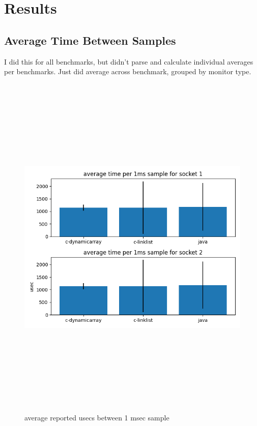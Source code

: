 \section{Results}

\subsection{Average Time Between Samples}
I did this for all benchmarks, but didn't parse and calculate individual averages per benchmarks. Just did average across benchmark, grouped by monitor type.
    \begin{figure}[H]
    	\centering
    	\includegraphics[width=17cm,height=17cm,keepaspectratio]{AsyncMonitorCompares/time-energy-persample/timestamp_average_usec_per-sample.png}
    	\caption{average reported usecs between 1 msec sample}
   	\label{fig:xalan-PKG-Time-scatter}
    \end{figure}

